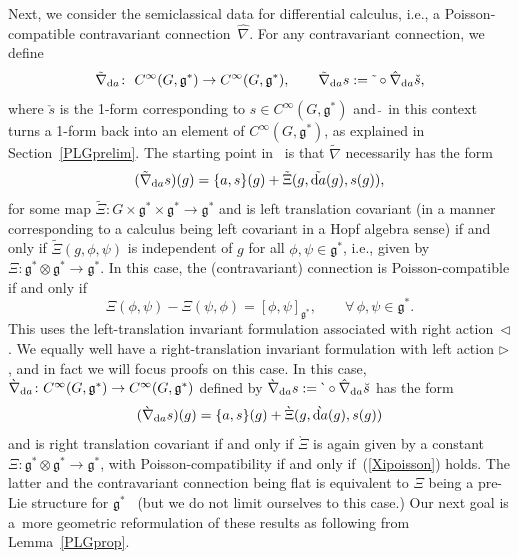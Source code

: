 \documentclass[pdftex]{sigma}
\numberwithin{equation}{section}
\newcommand{\<}{{\langle}}
\renewcommand{\>}{{\rangle}}
\newcommand{\tens}{\otimes}
\newcommand{\extd}{{\rm d}}
\newcommand{\la}{{\triangleright}}
\newcommand{\ra}{{\triangleleft}}
\newcommand{\cg}{{\mathfrak{g}}}
\newcommand{\tilder}{\grave}
\newcommand{\hatr}{\breve }
\newcommand{\hatl}{\check }
\begin{document}
Next, we consider the semiclassical data for differential calculus, i.e., a Poisson-compatible contravariant connection~$\hat\nabla$. For any contravariant connection, we define
\begin{equation*} \tilde{\nabla}_{\extd a}\colon \ C^\infty(G,\mathfrak{g}^*)\rightarrow C^\infty(G,\mathfrak{g}^*),\qquad \tilde{\nabla}_{\extd a}s:=\tilde{\ }\circ{\hat\nabla}_{\extd a}\hatl s,\end{equation*}
where $\hatl s$ is the 1-form corresponding to $s\in C^\infty(G,\cg^*)$ and $\tilde{\ }$ in this context turns a 1-form back into an element of $C^\infty(G,\cg^*)$, as explained in Section~\ref{PLGprelim}.
The starting point in~\cite{BegMa:sem} is that $\tilde\nabla$ necessarily has the form
\begin{equation}\label{mapXi}
(\tilde{\nabla}_{\extd a}s)(g)=\lbrace a,s\rbrace(g)+\tilde{\Xi}(g,\tilde{\extd a}(g),s(g)),
\end{equation}
for some map $\tilde\Xi\colon G\times\mathfrak{g}^*\times\mathfrak{g}^*\rightarrow\mathfrak{g}^*$ and is left translation covariant (in a manner corresponding to a calculus being left covariant in a Hopf algebra sense) if and only if $\tilde{\Xi}(g,\phi,\psi)$ is independent of $g$ for all $\phi,\psi\in\mathfrak{g}^*$, i.e., given by $\Xi\colon \cg^*\tens\cg^*\to \cg^*$. In this case, the (contravariant) connection is Poisson-compatible if and only if
\begin{equation}\label{Xipoisson} \Xi(\phi,\psi)-\Xi(\psi,\phi)=[\phi,\psi]_{\mathfrak{g}^*}, \qquad \forall\, \phi,\psi\in\mathfrak{g}^*.
\end{equation}
This uses the left-translation invariant formulation associated with right action~$\ra$. We equally well have a right-translation invariant formulation with left action $\la$, and in fact we will focus proofs on this case. In this case, $\tilder{\nabla}_{\extd a}\colon C^\infty(G,\mathfrak{g}^*)\rightarrow C^\infty(G,\mathfrak{g}^*)$ defined by $\tilder{\nabla}_{\extd a}s:=\tilder{\ }\circ{\hat\nabla}_{\extd a}\hatr s$ has the form
\begin{equation*}%
(\tilder{\nabla}_{\extd a}s)(g)=\lbrace a,s\rbrace(g)+\tilder{\Xi}(g,\tilder{\extd a}(g),s(g))
\end{equation*}
and is right translation covariant if and only if $\tilder\Xi$ is again given by a constant $\Xi\colon \cg^*\tens\cg^*\to \cg^*$, with Poisson-compatibility if and only if~(\ref{Xipoisson}) holds. The latter and the contravariant connection being flat is equivalent to $\Xi$ being a pre-Lie structure for $\cg^*$~\cite{MaTao:plg} (but we do not limit ourselves to this case.) Our next goal is a~more geometric reformulation of these results as following from Lemma~\ref{PLGprop}.
\end{document}
